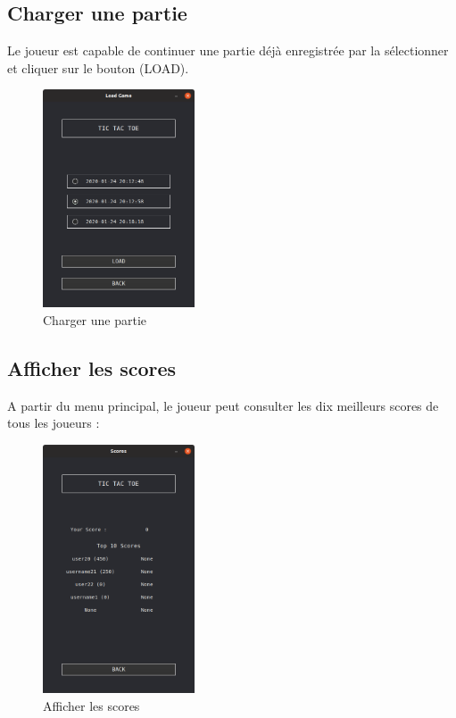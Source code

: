 \subsection{Charger une partie}
Le joueur est capable de continuer une partie déjà enregistrée par la sélectionner et cliquer sur le bouton (LOAD).
\begin{figure}[H]
	\centering
	\includegraphics[width=0.4\textwidth]{select game to load.PNG}
	  \caption{Charger une partie}
	\label{fig:Charger une partie}
\end{figure}
\clearpage
\subsection{Afficher les scores}
A partir du menu principal, le joueur peut consulter les dix meilleurs scores de tous les joueurs :
\begin{figure}[H]
	\centering
	\includegraphics[width=0.4\textwidth]{scores page.PNG}
	  \caption{Afficher les scores}
	\label{fig:Afficher les scores}
\end{figure}
\clearpage
